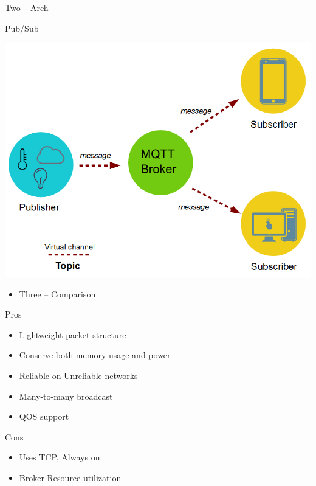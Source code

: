 \documentclass[presentation]{beamer}
\begin{document}
\begin{frame}[label={sec:org4dfd9dd}]{Two -- Arch}
\begin{block}{Pub/Sub}
\begin{center}
\includegraphics[width=.9\linewidth]{mqtt_arch.png}
\end{center}
\begin{itemize}
\item Three -- Comparison
\end{itemize}
\end{block}
\begin{block}{Pros}
\begin{itemize}
\item Lightweight packet structure
\item Conserve both memory usage and power
\item Reliable on Unreliable networks
\item Many-to-many broadcast
\item QOS support
\end{itemize}
\end{block}
\begin{block}{Cons}
\begin{itemize}
\item Uses TCP, Always on
\item Broker Resource utilization
\end{itemize}
\end{block}
\end{frame}
\end{document}
